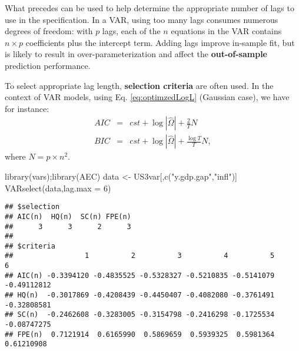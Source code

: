 \documentclass[
  12pt,
]{book}
\newenvironment{Shaded}{\begin{snugshade}}{\end{snugshade}}
\newcommand{\AttributeTok}[1]{\textcolor[rgb]{0.77,0.63,0.00}{#1}}
\newcommand{\CommentTok}[1]{\textcolor[rgb]{0.56,0.35,0.01}{\textit{#1}}}
\newcommand{\DecValTok}[1]{\textcolor[rgb]{0.00,0.00,0.81}{#1}}
\newcommand{\FunctionTok}[1]{\textcolor[rgb]{0.00,0.00,0.00}{#1}}
\newcommand{\NormalTok}[1]{#1}
\newcommand{\OtherTok}[1]{\textcolor[rgb]{0.56,0.35,0.01}{#1}}
\newcommand{\SpecialCharTok}[1]{\textcolor[rgb]{0.00,0.00,0.00}{#1}}
\newcommand{\StringTok}[1]{\textcolor[rgb]{0.31,0.60,0.02}{#1}}
\theoremstyle{definition}
\theoremstyle{definition}
\theoremstyle{definition}
\theoremstyle{definition}
\theoremstyle{remark}
\begin{document}
What precedes can be used to help determine the appropriate number of lags to use in the specification. In a VAR, using too many lags consumes numerous degrees of freedom: with \(p\) lags, each of the \(n\) equations in the VAR contains \(n\times p\) coefficients plus the intercept term. Adding lags improve in-sample fit, but is likely to result in over-parameterization and affect the \textbf{out-of-sample} prediction performance.

To select appropriate lag length, \textbf{selection criteria} are often used. In the context of VAR models, using Eq. \eqref{eq:optimzedLogL} (Gaussian case), we have for instance:
\begin{eqnarray*}
AIC & = & cst + \log\left|\hat{\Omega}\right|+\frac{2}{T}N\\
BIC & = & cst + \log\left|\hat{\Omega}\right|+\frac{\log T}{T}N,
\end{eqnarray*}
where \(N=p \times n^{2}\).

\begin{Shaded}
\begin{Highlighting}[]
\FunctionTok{library}\NormalTok{(vars);}\FunctionTok{library}\NormalTok{(AEC)}
\NormalTok{data }\OtherTok{\textless{}{-}}\NormalTok{ US3var[,}\FunctionTok{c}\NormalTok{(}\StringTok{"y.gdp.gap"}\NormalTok{,}\StringTok{"infl"}\NormalTok{)]}
\FunctionTok{VARselect}\NormalTok{(data,}\AttributeTok{lag.max =} \DecValTok{6}\NormalTok{)}
\end{Highlighting}
\end{Shaded}

\begin{verbatim}
## $selection
## AIC(n)  HQ(n)  SC(n) FPE(n) 
##      3      3      2      3 
## 
## $criteria
##                 1          2          3          4          5           6
## AIC(n) -0.3394120 -0.4835525 -0.5328327 -0.5210835 -0.5141079 -0.49112812
## HQ(n)  -0.3017869 -0.4208439 -0.4450407 -0.4082080 -0.3761491 -0.32808581
## SC(n)  -0.2462608 -0.3283005 -0.3154798 -0.2416298 -0.1725534 -0.08747275
## FPE(n)  0.7121914  0.6165990  0.5869659  0.5939325  0.5981364  0.61210908
\end{verbatim}

\begin{Shaded}
\end{Shaded}
\end{document}
